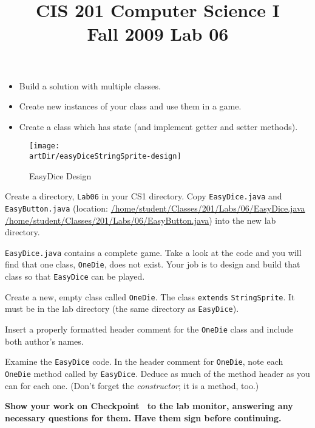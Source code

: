\documentclass[12pt,twoside]{memoir}
\title{CIS 201 Computer Science I\\Fall 2009 Lab #1}%
\newcommand\code[1]{\lstinline^#1^}
\newcommand\fname[1]{\texttt{#1}}
\newenvironment{Checkpoint}[1]{%
\begin{Exercise}[name={Checkpoint},title={#1}]}{%
\end{Exercise}%
\textbf{Show your work on Checkpoint~\theExercise{} to the lab monitor, %
  answering any necessary questions for them.  Have them sign before continuing.}}
\newcommand{\artDir}{../art}
\newcommand{\lab}[1]{%
\title{CIS 201 Computer Science I\\Fall 2009 Lab #1}%
\maketitle%
}
\begin{document}
\lab{06}

\begin{itemize}
\item Build a solution with multiple classes.
\item Create new instances of your class and use them in a game.
\item Create a class which has state (and implement getter and setter
  methods). 
\end{itemize}

\begin{figure}[htb]
  \begin{center}    
    \texttt{[image: \\artDir/easyDiceStringSprite-design]}  
    \caption{EasyDice Design}
  \label{fig:login}
  \end{center}
\end{figure}

\begin{Checkpoint}{Getting Started}
  Create a directory, \fname{Lab06} in your CS1 directory. Copy
  \fname{EasyDice.java}  and \fname{EasyButton.java} (location:
  \url{/home/student/Classes/201/Labs/06/EasyDice.java} \url{/home/student/Classes/201/Labs/06/EasyButton.java}) into the new
  lab directory.

  \fname{EasyDice.java} contains a complete game. Take a look at the
  code and you will find that one class, \code{OneDie}, does not
  exist. Your job is to design and build that class so that
  \code{EasyDice} can be played.

  Create a new, empty class called \code{OneDie}. The class
  \code{extends} \code{StringSprite}. It must be in the lab directory
  (the same directory as \code{EasyDice}). 

  Insert a properly formatted header comment for the \code{OneDie}
  class and include both author's names.

  Examine the \code{EasyDice} code. In the header comment for
  \code{OneDie}, note each \code{OneDie} method called by
  \code{EasyDice}. Deduce as much of the method header as you can for
  each one. (Don't forget the \emph{constructor}; it is a method,
  too.)
\end{Checkpoint}
\end{document}
